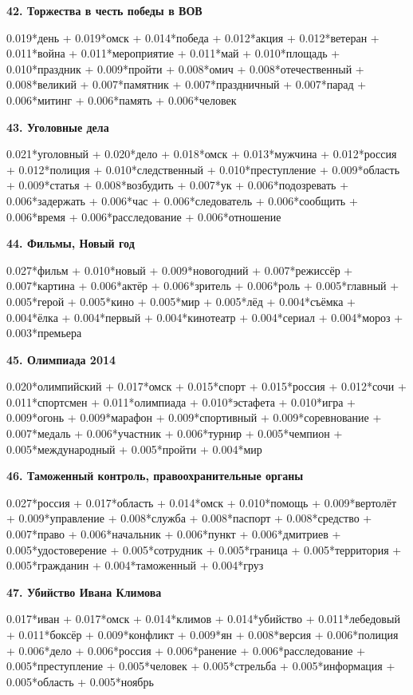 \textbf{42. Торжества в честь победы в ВОВ}

0.019*день + 0.019*омск + 0.014*победа + 0.012*акция + 0.012*ветеран + 0.011*война + 0.011*мероприятие + 0.011*май + 0.010*площадь + 0.010*праздник + 0.009*пройти + 0.008*омич + 0.008*отечественный + 0.008*великий + 0.007*памятник + 0.007*праздничный + 0.007*парад + 0.006*митинг + 0.006*память + 0.006*человек

\textbf{43. Уголовные дела}

0.021*уголовный + 0.020*дело + 0.018*омск + 0.013*мужчина + 0.012*россия + 0.012*полиция + 0.010*следственный + 0.010*преступление + 0.009*область + 0.009*статья + 0.008*возбудить + 0.007*ук + 0.006*подозревать + 0.006*задержать + 0.006*час + 0.006*следователь + 0.006*сообщить + 0.006*время + 0.006*расследование + 0.006*отношение

\textbf{44. Фильмы, Новый год}

0.027*фильм + 0.010*новый + 0.009*новогодний + 0.007*режиссёр + 0.007*картина + 0.006*актёр + 0.006*зритель + 0.006*роль + 0.005*главный + 0.005*герой + 0.005*кино + 0.005*мир + 0.005*лёд + 0.004*съёмка + 0.004*ёлка + 0.004*первый + 0.004*кинотеатр + 0.004*сериал + 0.004*мороз + 0.003*премьера

\textbf{45. Олимпиада 2014}

0.020*олимпийский + 0.017*омск + 0.015*спорт + 0.015*россия + 0.012*сочи + 0.011*спортсмен + 0.011*олимпиада + 0.010*эстафета + 0.010*игра + 0.009*огонь + 0.009*марафон + 0.009*спортивный + 0.009*соревнование + 0.007*медаль + 0.006*участник + 0.006*турнир + 0.005*чемпион + 0.005*международный + 0.005*пройти + 0.004*мир

\textbf{46. Таможенный контроль, правоохранительные органы}

0.027*россия + 0.017*область + 0.014*омск + 0.010*помощь + 0.009*вертолёт + 0.009*управление + 0.008*служба + 0.008*паспорт + 0.008*средство + 0.007*право + 0.006*начальник + 0.006*пункт + 0.006*дмитриев + 0.005*удостоверение + 0.005*сотрудник + 0.005*граница + 0.005*территория + 0.005*гражданин + 0.004*таможенный + 0.004*груз

\textbf{47. Убийство Ивана Климова\footnotemark}

0.017*иван + 0.017*омск + 0.014*климов + 0.014*убийство + 0.011*лебедовый + 0.011*боксёр + 0.009*конфликт + 0.009*ян + 0.008*версия + 0.006*полиция + 0.006*дело + 0.006*россия + 0.006*ранение + 0.006*расследование + 0.005*преступление + 0.005*человек + 0.005*стрельба + 0.005*информация + 0.005*область + 0.005*ноябрь

